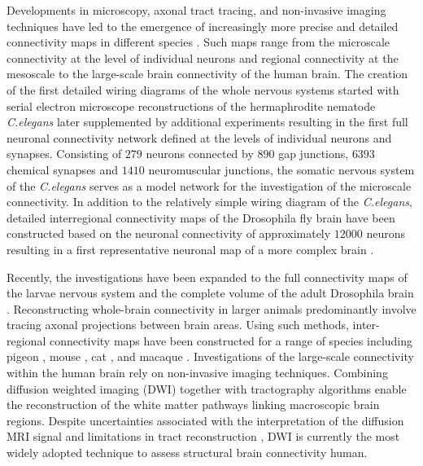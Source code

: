 Developments in microscopy, axonal tract tracing, and non-invasive imaging techniques have led to the emergence of increasingly more precise and detailed connectivity maps in different species \citep{Bota2015,Chiang2011a,Oh2014,Scannell1999,Shanahan2013,Stephan2001,VanEssen2013,White1986}. Such maps range from the microscale connectivity at the level of individual neurons and regional connectivity at the mesoscale to the large-scale brain connectivity of the human brain. The creation of the first detailed wiring diagrams of the whole nervous systems started with serial electron microscope reconstructions of the hermaphrodite nematode \textit{C.elegans} \citep{White1986} later supplemented by additional experiments \citep{Varshney2011} resulting in the first full neuronal connectivity network defined at the levels of individual neurons and synapses. Consisting of $279$ neurons connected by $890$ gap junctions, $6393$ chemical synapses and $1410$ neuromuscular junctions, the somatic nervous system of the \textit{C.elegans} serves as a model network for the investigation of the microscale connectivity. In addition to the relatively simple wiring diagram of the \textit{C.elegans}, detailed interregional connectivity maps of the Drosophila fly brain have been constructed based on the neuronal connectivity of approximately $12000$ neurons resulting in a first representative neuronal map of a more complex brain \citep{Chiang2011a}.

Recently, the investigations have been expanded to the full connectivity maps of the larvae nervous system \citep{Ohyama2015} and the complete volume of the adult Drosophila brain \citep{Zheng2018}. Reconstructing whole-brain connectivity in larger animals predominantly involve tracing axonal projections between brain areas. Using such methods, inter-regional connectivity maps have been constructed for a range of species including pigeon \citep{Shanahan2013}, mouse \citep{Oh2014}, cat \citep{Scannell1995}, and macaque \citep{Harriger2012}. Investigations of the large-scale connectivity within the human brain rely on non-invasive imaging techniques. Combining diffusion weighted imaging (DWI) together with tractography algorithms \citep{Jbabdi2011} enable the reconstruction of the white matter pathways linking macroscopic brain regions. Despite uncertainties associated with the interpretation of the diffusion MRI signal and limitations in tract reconstruction \citep{Jones2010,Jones2013,Thomas2014}, DWI is currently the most widely adopted technique to assess structural brain connectivity human. 

